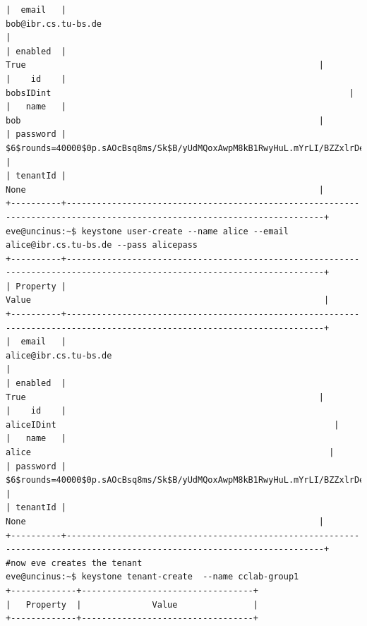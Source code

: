 \documentclass[a4paper,ngerman,bibtotocliststotoc]{scrartcl}
\begin{document}
\begin{verbatim}
|  email   |                                                   bob@ibr.cs.tu-bs.de                                                   |
| enabled  |                                                           True                                                          |
|    id    |                                                        bobsIDint                                                           |
|   name   |                                                           bob                                                           |
| password | $6$rounds=40000$0p.sAOcBsq8ms/Sk$B/yUdMQoxAwpM8kB1RwyHuL.mYrLI/BZZxlrDeT1U.Rm6QfmBn5/MA86KcBHz90Hr67bOV8EGdfUbOkJ0JwBW. |
| tenantId |                                                           None                                                          |
+----------+-------------------------------------------------------------------------------------------------------------------------+
eve@uncinus:~$ keystone user-create --name alice --email alice@ibr.cs.tu-bs.de --pass alicepass
+----------+-------------------------------------------------------------------------------------------------------------------------+
| Property |                                                          Value                                                          |
+----------+-------------------------------------------------------------------------------------------------------------------------+
|  email   |                                                 alice@ibr.cs.tu-bs.de                                                   |
| enabled  |                                                           True                                                          |
|    id    |                                                        aliceIDint                                                       |
|   name   |                                                         alice                                                           |
| password | $6$rounds=40000$0p.sAOcBsq8ms/Sk$B/yUdMQoxAwpM8kB1RwyHuL.mYrLI/BZZxlrDeT1U.Rm6QfmBn5/MA86KcBHz90Hr67bOV8EGdfUbOkJ0JwBW. |
| tenantId |                                                           None                                                          |
+----------+-------------------------------------------------------------------------------------------------------------------------+
#now eve creates the tenant
eve@uncinus:~$ keystone tenant-create  --name cclab-group1
+-------------+----------------------------------+
|   Property  |              Value               |
+-------------+----------------------------------+

\end{verbatim}
\end{document}
